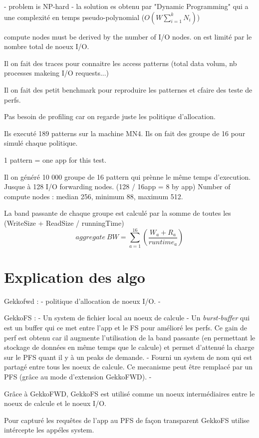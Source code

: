 \documentclass[10pt, a4paper]{article}
\begin{document}
- problem is NP-hard
- la solution es obtenu par "Dynamic Programming" qui a une complexité en temps pseudo-polynomial ($O(W\sum^{k}_{i=1}N_i)$)


compute nodes must be derived by the number of I/O nodes.
on est limité par le nombre total de noeux I/O.

Il on fait des traces pour connaitre les access patterns (total data volum, nb processes makeing I/O requests...)

Il on fait des petit benchmark pour reproduire les patternes et cfaire des teste de perfs.

Pas besoin de profiling car on regarde juste les politique d'allocation.

Ils executé 189 patterns sur la machine MN4.
Ils on fait des groupe de 16 pour simulé chaque politique.

1 pattern = one app for this test.

Il on généré 10 000 groupe de 16 pattern qui prènne le même temps d'execution.
Jusque à 128 I/O forwarding nodes. (128 / 16app = 8 by app)
Number of compute nodes : median 256, minimum 88, maximum 512.

La band passante de chaque groupe est calculé par la somme de toutes les (WriteSize + ReadSize / runningTime)
\begin{equation*}aggregate\ BW=\sum_{a=1}^{16}\left(\frac{W_{a}+R_{a}}{runtime_{a}}\right) \tag{2}\end{equation*}

\section{Explication des algo}
Gekkofwd :
- politique d'allocation de noeux I/O.
- 

GekkoFS :
- Un system de fichier local au noeux de calcule
- Un \emph{burst-buffer} qui est un buffer qui ce met entre l'app et le FS pour amélioré les perfs. Ce gain de perf est obtenu car il augmente l'utilisation de la band passante (en permettant le stockage de données en même temps que le calcule) et permet d'attenué la charge sur le PFS quant il y à un peaks de demande.
- Fourni un system de nom qui est partagé entre tous les noeux de calcule. Ce mecanisme peut être remplacé par un PFS (grâce au mode d'extension GekkoFWD).
- 

Grâce à GekkoFWD, GekkoFS est utilisé comme un noeux intermédiaires entre le noeux de calcule et le noeux I/O.

Pour capturé les requêtes de l'app au PFS de façon transparent GekkoFS utilise intércepte les appéles system.
\end{document}
